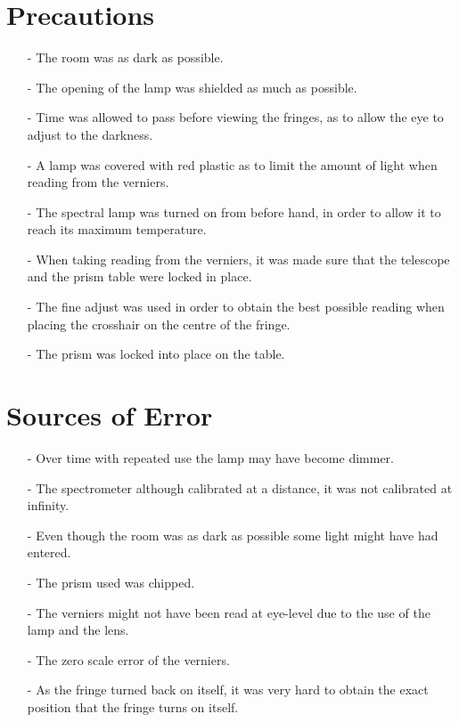 \documentclass[12pt, a4paper]{article}
\begin{document}
\section*{Precautions}
\begin{itemize}
    \item[-] The room was as dark as possible.
    \item[-] The opening of the lamp was shielded as much as possible.
    \item[-] Time was allowed to pass before viewing the fringes, as to allow the eye to adjust to the darkness.
    \item[-] A lamp was covered with red plastic as to limit the amount of light when reading from the verniers. 
    \item[-] The spectral lamp was turned on from before hand, in order to allow it to reach its maximum temperature.
    \item[-] When taking reading from the verniers, it was made sure that the telescope and the prism table were locked in place. 
    \item[-] The fine adjust was used in order to obtain the best possible reading when placing the crosshair on the centre of the fringe.
    \item[-] The prism was locked into place on the table.
\end{itemize}

\section*{Sources of Error}
\begin{itemize}
    \item[-] Over time with repeated use the lamp may have become dimmer.
    \item[-] The spectrometer although calibrated at a distance, it was not calibrated at infinity.
    \item[-] Even though the room was as dark as possible some light might have had entered. 
    \item[-] The prism used was chipped. 
    \item[-] The verniers might not have been read at eye-level due to the use of the lamp and the lens.
    \item[-] The zero scale error of the verniers.
    \item[-] As the fringe turned back on itself, it was very hard to obtain the exact position that the fringe turns on itself. 
\end{itemize}
\end{document}
